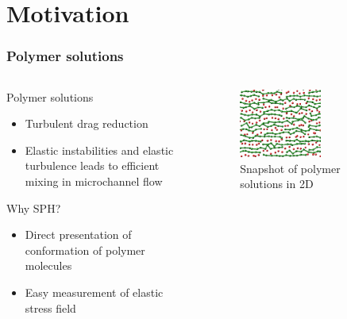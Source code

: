 \section[Motivation]{Motivation}
\begin{frame}
  \frametitle{Polymer solutions}
  \begin{columns}
    \begin{column}{0.5\textwidth}
      \begin{block}{Polymer solutions}
        \begin{itemize}
        \item Turbulent drag reduction
        \item Elastic instabilities and elastic turbulence leads to efficient mixing in microchannel flow
        \end{itemize}
      \end{block}
      \begin{block}{Why SPH?}
        \begin{itemize} 
        \item Direct presentation of conformation of polymer molecules
        \item Easy measurement of elastic stress field
        \end{itemize}
      \end{block}
    \end{column}
    \begin{column}{0.5\textwidth}
      \begin{figure}[t]
        \centering
        \includegraphics[width=0.6\textwidth]{img/polymers.png}
        \caption{Snapshot of polymer solutions in 2D}
        \label{fig:snap}
      \end{figure}
    \end{column}
  \end{columns}
\end{frame}


